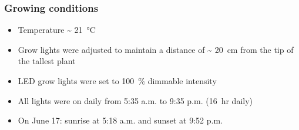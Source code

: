 \documentclass[12pt, aspectratio=1610]{beamer}
\begin{document}
    \begin{frame}
        \frametitle{Growing conditions}
        \begin{itemize}
            \item Temperature \~{} \qty[mode=text]{21}{\degreeCelsius}
            \item Grow lights were adjusted to maintain a distance of \~{} \qty[mode=text]{20}{\cm} from the tip of the tallest plant
            \item LED grow lights were set to \qty[mode=text]{100}{\percent} dimmable intensity
            \item All lights were on daily from 5:35 a.m. to 9:35 p.m. (\qty[mode=text]{16}{hr} daily)
            \item On June 17: sunrise at 5:18 a.m. and sunset at 9:52 p.m.
        \end{itemize}
    \end{frame}
\end{document}
